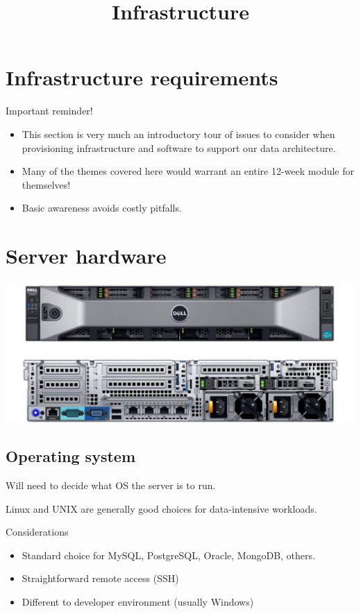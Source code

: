 \documentclass[slides]{pgnotes}
\title{Infrastructure}
\begin{document}
\maketitle

\tableofcontents

\section{Infrastructure requirements}

\begin{redbox}{Important reminder!}
  \begin{itemize}
  \item This section is very much an introductory tour of issues to consider when provisioning infrastructure and software to support our data architecture.
  \item Many of the themes covered here would warrant an entire 12-week module for themselves!
  \item Basic awareness avoids costly pitfalls.
  \end{itemize}
\end{redbox}

\section{Server hardware}

\begin{center}
  \includegraphics[width=0.8\linewidth]{dell_poweredge}
\end{center}

\subsection{Operating system}

Will need to decide what OS the server is to run.

Linux and UNIX are generally good choices for data-intensive workloads.

\begin{bluebox}{Considerations}
  \begin{itemize}
  \item Standard choice for MySQL, PostgreSQL, Oracle, MongoDB, others.
  \item Straightforward remote access (SSH)
  \end{itemize}
  \tcblower
  \begin{itemize}
  \item Different to developer environment (usually Windows)
  \end{itemize}
\end{bluebox}
\end{document}
